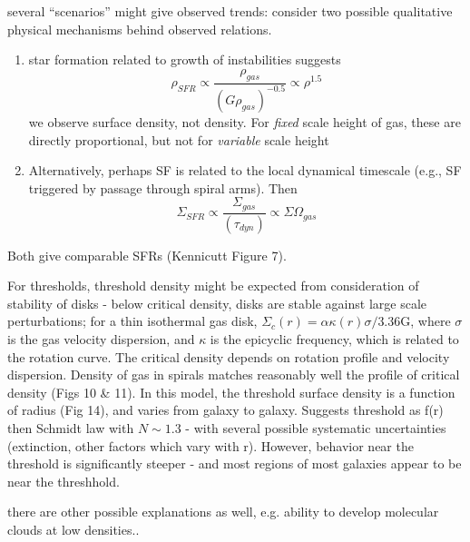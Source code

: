 \documentclass{article}
\begin{document}
several ``scenarios'' might give observed trends: consider two possible
qualitative physical mechanisms behind observed relations.
\begin{enumerate}
    \item star formation related to growth of instabilities suggests
        \[
            \rho_{SFR} \propto \frac{\rho_{gas}}{(G\rho_{gas})^{-0.5}} \propto
            \rho^{1.5}
            \]
        we observe surface density, not density. For \emph{fixed} scale height of
        gas, these are directly proportional, but not for \emph{variable} scale
        height
    \item Alternatively, perhaps SF is related to the local dynamical
        timescale (e.g., SF triggered by passage through spiral arms). Then
        \[
            \Sigma_{SFR}
            \propto \frac{\Sigma_{gas}}{(\tau_{dyn})}
            \propto \Sigma\Omega_{gas}
            \]
\end{enumerate}
Both give comparable SFRs (Kennicutt Figure 7).

For thresholds, threshold density might be expected from consideration of
stability of disks - below critical density, disks are stable against large
scale perturbations; for a thin isothermal gas disk,
$\Sigma_{c}(r) = \alpha \kappa(r) \sigma / 3.36$G,
where $\sigma$ is the gas velocity dispersion, and $\kappa$ is the
epicyclic frequency, which is related to the rotation curve. The critical
density depends on rotation profile and velocity dispersion. Density of gas
in spirals matches reasonably well the profile of critical density (Figs 10
\& 11). In this model, the threshold surface density is a function of radius
(Fig 14), and varies from galaxy to galaxy. Suggests threshold as f(r) then
Schmidt law with $N\sim 1.3$ - with several possible systematic
uncertainties (extinction, other factors which vary with r). However,
behavior near the threshold is significantly steeper - and most regions of
most galaxies appear to be near the threshhold.

there are other possible explanations as well, e.g. ability to develop
molecular clouds at low densities..
\end{document}
